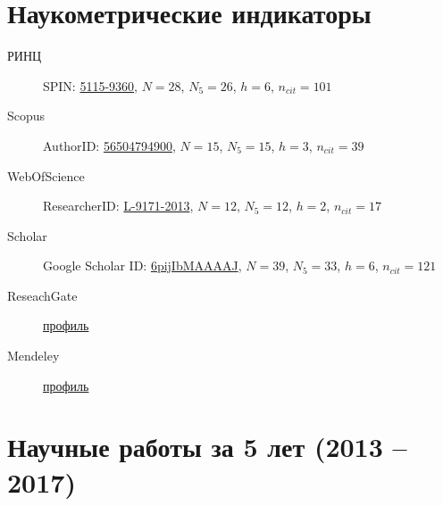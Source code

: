 \documentclass[a4paper,12pt]{article}
\begin{document}
	\sloppy
	\renewcommand{\refname}{}
	
	\section*{Наукометрические индикаторы}
	\begin{description}
		\item [РИНЦ] SPIN: \href{http://elibrary.ru/author_profile.asp?authorid=724544}{5115-9360}, $N=28$, $N_5=26$, $h=6$, $n_{cit}=101$
		
		\item [Scopus] AuthorID: \href{https://www.scopus.com/authid/detail.uri?authorId=56504794900}{56504794900}, $N=15$, $N_5=15$, $h=3$, $n_{cit}=39$
		
		\item[WebOfScience] ResearcherID: \href{http://www.researcherid.com/rid/L-9171-2013}{L-9171-2013}, $N=12$, $N_5=12$, $h=2$, $n_{cit}=17$
		
		\item[Scholar] Google Scholar ID: \href{https://scholar.google.ru/citations?user=6pijIbMAAAAJ&hl=ru}{6pijIbMAAAAJ}, $N=39$, $N_5=33$, $h=6$, $n_{cit}=121$
		
		\item[ReseachGate] \href{https://www.researchgate.net/profile/Alexandr_Panov2}{профиль}
		
		\item[Mendeley] \href{https://www.mendeley.com/profiles/aleksandr-panov6/}{профиль}
		
	\end{description}

	\section*{Научные работы за 5 лет (2013 -- 2017)}
	\nocite{*}

	\begin{refsection}
		\nocite{*}
		\printbibliography[title={Статьи в рецензируемых журналах}, heading=subbibliography, keyword={mypub},check=recent]
		\printbibliography[title={Статьи на конференциях}, heading=subbibliography, keyword={myconf},check=recent]
		\printbibliography[title={Тезисы выступлений}, heading=subbibliography, keyword={myth},check=recent]
		\printbibliography[title={Переводные версии статей}, heading=subbibliography, keyword={mypubtr},check=recent, resetnumbers=true]
		\printbibliography[title={Книги и монографии}, heading=subbibliography, keyword={mybook},check=recent, resetnumbers=true]
	\end{refsection}
\end{document}
